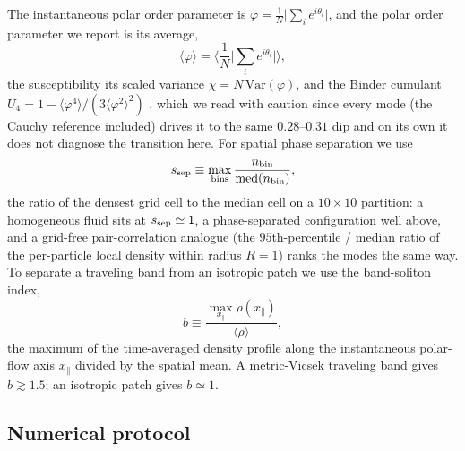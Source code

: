 \documentclass[11pt,a4paper]{article}
\begin{document}
The instantaneous polar order parameter is $\varphi =
\frac{1}{N}\big|\sum_i e^{i\theta_i}\big|$, and the polar order
parameter we report is its average,
\begin{equation}
\langle\varphi\rangle = \Big\langle \frac{1}{N}
   \big|\textstyle\sum_i e^{i\theta_i}\big|\Big\rangle,
\end{equation}
the susceptibility its scaled variance $\chi = N\,
\mathrm{Var}(\varphi)$, and the Binder cumulant $U_4 = 1
- \langle\varphi^4\rangle / (3 \langle\varphi^2\rangle^2)$
\citep{Binder1984}, which we read with caution since every mode
(the Cauchy reference included) drives it to the same
$0.28$--$0.31$ dip and on its own it does not diagnose the
transition here. For spatial phase separation we use
\begin{equation}
s_{\rm sep} \equiv \max_{\rm bins}\frac{n_{\rm bin}}
   {\mathrm{med}(n_{\rm bin})},
\label{eq:s_sep}
\end{equation}
the ratio of the densest grid cell to the median cell on a
$10 \times 10$ partition: a homogeneous fluid sits at
$s_{\rm sep} \simeq 1$, a phase-separated configuration well
above, and a grid-free pair-correlation analogue (the
$95$th-percentile / median ratio of the per-particle local
density within radius $R = 1$) ranks the modes the same way. To
separate a traveling band from an isotropic patch we use the
band-soliton index,
\begin{equation}
b \equiv \frac{\max_{x_\parallel} \rho(x_\parallel)}
   {\langle\rho\rangle},
\label{eq:b}
\end{equation}
the maximum of the time-averaged density profile along the
instantaneous polar-flow axis $x_\parallel$ divided by the
spatial mean. A metric-Vicsek traveling band gives
$b \gtrsim 1.5$; an isotropic patch gives $b \simeq 1$.

\subsection{Numerical protocol}
\end{document}
